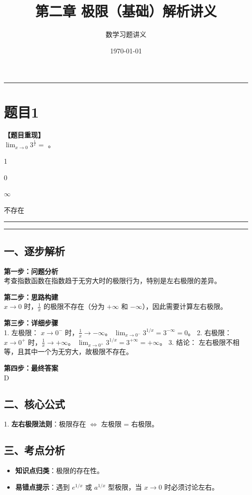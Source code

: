 \documentclass[12pt, a4paper]{ctexart}
\newcommand{\TopSeparator}{
    \par\noindent\rule{\textwidth}{1.5pt}\vspace{0.5em} %
}
\newcommand{\AnalysisSeparator}{
    \par\noindent\rule{\textwidth}{0.5pt}\vspace{0.2em}\hrule\vspace{0.5em} %
}
\newenvironment{RedAnalysis}{
    \par
    \color{red} %
}{
    \par
    \color{black} %
}
\newcommand{\choicesFour}[4]{
    \begin{enumerate}[label=\Alph*., itemsep=0pt, parsep=0pt, topsep=5pt, labelsep=0.5em]
        \begin{minipage}{0.22\linewidth} \item #1 \end{minipage}
        \begin{minipage}{0.22\linewidth} \item #2 \end{minipage}
        \begin{minipage}{0.22\linewidth} \item #3 \end{minipage}
        \begin{minipage}{0.22\linewidth} \item #4 \end{minipage}
    \end{enumerate}
}
\begin{document}
\title{\textbf{第二章 极限（基础）解析讲义}}
\author{数学习题讲义}
\date{\today}
\maketitle

\TopSeparator
\section*{题目1}

\textbf{【题目重现】} \\
$ \lim_{x\to0}3^{\frac{1}{x}}= $ \underline{\hspace{1cm}}。
\choicesFour{1}{0}{$ \infty $}{不存在}

\AnalysisSeparator

\begin{RedAnalysis}

\subsection*{一、逐步解析}

\textbf{第一步：问题分析} \\
考查指数函数在指数趋于无穷大时的极限行为，特别是左右极限的差异。

\textbf{第二步：思路构建} \\
$x \to 0$ 时，$\frac{1}{x}$ 的极限不存在（分为 $+\infty$ 和 $-\infty$），因此需要计算左右极限。

\textbf{第三步：详细步骤} \\
1. 左极限：
   $x \to 0^{-}$ 时，$\frac{1}{x} \to -\infty$。
   $\lim_{x\to 0^{-}} 3^{1/x} = 3^{-\infty} = 0$。
2. 右极限：
   $x \to 0^{+}$ 时，$\frac{1}{x} \to +\infty$。
   $\lim_{x\to 0^{+}} 3^{1/x} = 3^{+\infty} = +\infty$。
3. 结论：
   左右极限不相等，且其中一个为无穷大，故极限不存在。

\textbf{第四步：最终答案} \\
D

\subsection*{二、核心公式}
1. \textbf{左右极限法则}：极限存在 $\iff$ 左极限 = 右极限。

\subsection*{三、考点分析}
\begin{itemize}
    \item \textbf{知识点归类}：极限的存在性。
    \item \textbf{易错点提示}：遇到 $e^{1/x}$ 或 $a^{1/x}$ 型极限，当 $x \to 0$ 时必须讨论左右。
\end{itemize}

\end{RedAnalysis}
\end{document}
